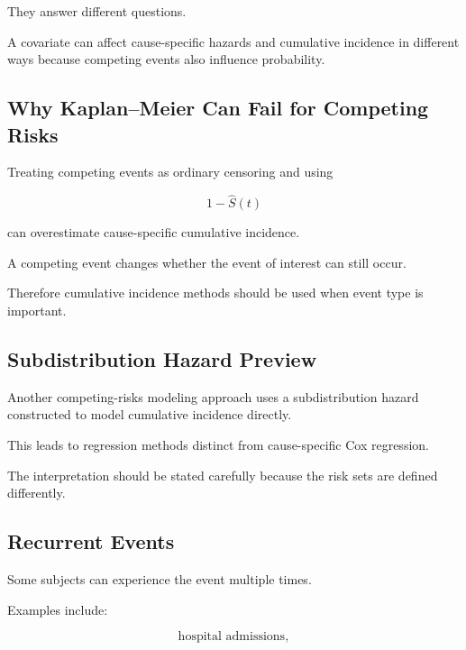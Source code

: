 They answer different questions.

A covariate can affect cause-specific hazards and cumulative incidence in
different ways because competing events also influence probability.

\subsection{Why Kaplan--Meier Can Fail for Competing Risks}
\label{subsec:km-competing-risks}

Treating competing events as ordinary censoring and using

\[
1-\widehat{S}(t)
\]

can overestimate cause-specific cumulative incidence.

A competing event changes whether the event of interest can still occur.

Therefore cumulative incidence methods should be used when event type is
important.

\subsection{Subdistribution Hazard Preview}
\label{subsec:subdistribution-hazard-preview}

Another competing-risks modeling approach uses a subdistribution hazard
constructed to model cumulative incidence directly.

This leads to regression methods distinct from cause-specific Cox
regression.

The interpretation should be stated carefully because the risk sets are
defined differently.

\subsection{Recurrent Events}
\label{subsec:recurrent-events}

Some subjects can experience the event multiple times.

Examples include:

\[
\boxed{
\text{hospital admissions},
}
\]

